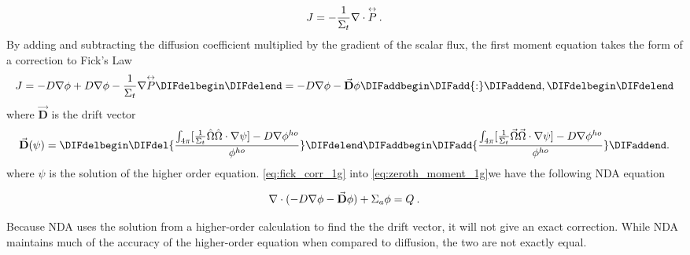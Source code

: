 \DIFdelend %
  \begin{equation}
  J= -\frac{1}{\Sigma_t} \nabla \cdot \overset{\text{\scriptsize$\leftrightarrow$}}{P}\:. 
  \end{equation}
  By adding and subtracting the diffusion coefficient multiplied by the gradient of the scalar flux, the first moment equation takes the form of a correction to Fick's Law
  \begin{equation}
  J = -D \nabla \phi + D \nabla \phi - \frac{1}{\Sigma_t} \nabla \overset{\text{\scriptsize$\leftrightarrow$}}{P} \\
  \DIFdelbegin %

\DIFdelend = -D \nabla \phi - \vec{\textbf{D}} \phi\DIFaddbegin \DIFadd{:}\DIFaddend ,
  \DIFdelbegin %

\DIFdelend \label{eq:fick_corr_1g}
  \end{equation}
  where $\vec{\textbf{D}}$ is the drift vector
 \begin{equation}
  \vec{\textbf{D}} (\psi) = \DIFdelbegin \DIFdel{\frac{\int_{4\pi} [\frac{1}{\Sigma_t} \hat{\Omega} \hat{\Omega}\cdot \nabla \psi] - D \nabla \phi^{ho}}{\phi^{ho}}}\DIFdelend \DIFaddbegin \DIFadd{\frac{\int_{4\pi} [\frac{1}{\Sigma_t} \vec{\Omega} \vec{\Omega}\cdot \nabla \psi] - D \nabla \phi^{ho}}{\phi^{ho}}}\DIFaddend .
  \label{eq:drift_vector}
  \end{equation} 
\DIFdelbegin {}\DIFdelend \DIFaddbegin {}\DIFaddend where $\psi$ is the solution of the higher order equation. \DIFdelbegin {}\DIFdelend \DIFaddbegin {}\DIFaddend \eqref{eq:fick_corr_1g} into \DIFaddbegin {}\DIFaddend \eqref{eq:zeroth_moment_1g}\DIFaddbegin \DIFadd{, }\DIFaddend we have the following NDA equation
  \DIFdelbegin \DIFdel{:
}%

\DIFdelend \begin{equation}
  \nabla\cdot(-D \nabla \phi - \vec{\bf D} \phi) + \Sigma_a \phi = Q \:. \label{eq:NDA_1g}
  \end{equation}

Because NDA uses the solution from a higher-order calculation to find the the drift vector, it will not give an exact correction. While NDA maintains much of the accuracy of the higher-order equation when compared to diffusion, the two are not exactly equal. 


